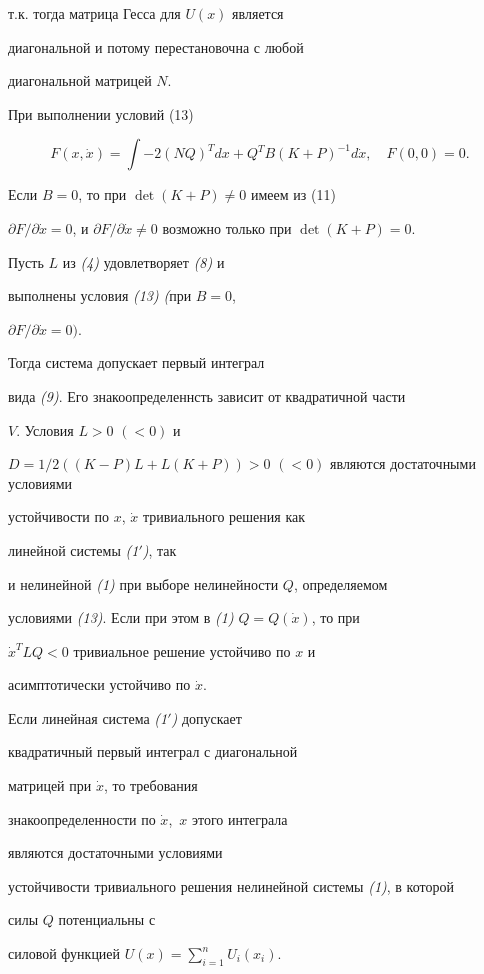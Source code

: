 т.к. тогда матрица Гесса для $U(x)$ является


диагональной и потому перестановочна с любой


диагональной матрицей $N$.





При выполнении условий (13)


$$


F(x,\Dot{x})=\int -2(NQ)^{T}dx + Q^{T}B(K+P)^{-1}d\Dot{x},\quad


F(0,0)=0.


$$


Если $B=0$, то при $\det(K+P)\ne 0$ имеем из (11)


$\partial F/\partial \Dot x =0$, и $\partial F/\partial


\Dot x \ne 0$ возможно только при $\det(K+P)= 0$.





\begin{propnonum} Пусть $L$ из {\em (4)} удовлетворяет {\em (8)} и


выполнены условия {\em (13)} {\em (}при $B=0$,


$\partial F/\partial \Dot x =0).$


Тогда система допускает первый интеграл


вида {\em (9)}. Его знакоопределеннсть зависит от квадратичной части


$V$. Условия $L>0$ $(<0)$ и


$D=1/2((K-P)L+L(K+P))>0$ $(<0)$ являются достаточными условиями


устойчивости по $x$, $\Dot x$ тривиального решения как


линейной системы {\em (1$'$)}, так


и нелинейной {\em (1)} при выборе нелинейности $Q$, определяемом


условиями {\em (13)}. Если при этом в {\em (1)\;} $Q=Q(\Dot x)$, то при


$\Dot x^{T}LQ<0$ тривиальное решение устойчиво по $x$ и


асимптотически устойчиво по $\Dot x$.


\end{propnonum}





\begin{thm} Если линейная система {\em (1$'$)} допускает


квадратичный первый интеграл с диагональной


матрицей при $\Dot x $, то требования


знакоопределенности по $\Dot x$,~$x$ этого интеграла


являются достаточными условиями


устойчивости тривиального решения нелинейной системы {\em (1)}, в которой


силы $Q$ потенциальны с


силовой функцией $U(x)=\sum\limits_{i=1}^{n}U_{i}(x_{i})$.


\end{thm}





